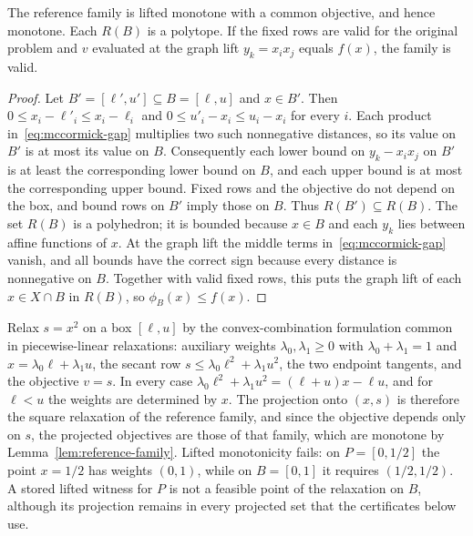 \begin{lemma}\label{lem:reference-family}
The reference family is lifted monotone with a common objective, and hence
monotone. Each $R(B)$ is a polytope. If the fixed rows are valid for the
original problem and $v$ evaluated at the graph lift $y_k=x_ix_j$ equals
$f(x)$, the family is valid.
\end{lemma}
\begin{proof}
Let $B'=[\ell',u']\subseteq B=[\ell,u]$ and $x\in B'$. Then
$0\le x_i-\ell'_i\le x_i-\ell_i$ and $0\le u'_i-x_i\le u_i-x_i$ for every
$i$. Each product in~\eqref{eq:mccormick-gap} multiplies two such
nonnegative distances, so its value on $B'$ is at most its value on $B$.
Consequently each lower bound on $y_k-x_ix_j$ on $B'$ is at least the
corresponding lower bound on $B$, and each upper bound is at most the
corresponding upper bound. Fixed rows and the objective do not depend on
the box, and bound rows on $B'$ imply those on $B$. Thus
$R(B')\subseteq R(B)$. The set $R(B)$ is a polyhedron; it is bounded
because $x\in B$ and each $y_k$ lies between affine functions of $x$.
At the graph lift the middle terms in~\eqref{eq:mccormick-gap} vanish,
and all bounds have the correct sign because every distance is
nonnegative on $B$. Together with valid fixed rows, this puts the graph
lift of each $x\in X\cap B$ in $R(B)$, so $\phi_B(x)\le f(x)$.
\end{proof}

\begin{example}\label{ex:lambda}
Relax $s=x^2$ on a box $[\ell,u]$ by the convex-combination formulation
common in piecewise-linear relaxations: auxiliary weights
$\lambda_0,\lambda_1\ge0$ with $\lambda_0+\lambda_1=1$ and
$x=\lambda_0\ell+\lambda_1u$, the secant row
$s\le\lambda_0\ell^2+\lambda_1u^2$, the two endpoint tangents, and the
objective $v=s$. In every case
$\lambda_0\ell^2+\lambda_1u^2=(\ell+u)x-\ell u$, and for $\ell<u$ the
weights are determined by $x$. The projection onto
$(x,s)$ is therefore the square relaxation of the reference family, and
since the objective depends only on $s$, the projected objectives are
those of that family, which are monotone by
Lemma~\ref{lem:reference-family}. Lifted monotonicity fails: on
$P=[0,1/2]$ the point $x=1/2$ has weights $(0,1)$, while on $B=[0,1]$ it
requires $(1/2,1/2)$. A stored lifted witness for $P$ is not a feasible
point of the relaxation on $B$, although its projection remains in every
projected set that the certificates below use.
\end{example}

